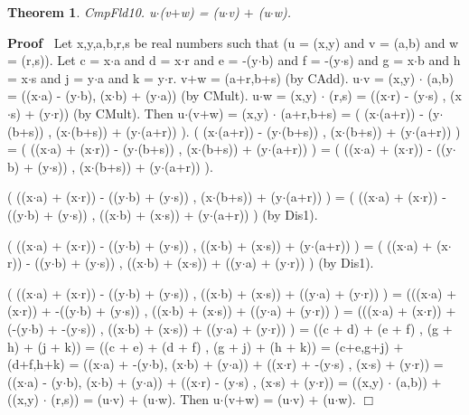\documentclass{article}
\newenvironment{forthel}{\begin{leftbar}}{\end{leftbar}}
\newenvironment{proof}{\noindent\textbf{Proof\ }}{\hspace*{\fill}$\Box$\medskip}
\newtheorem{theorem}{Theorem}
\newcommand{\cmul}{\cdot}
\newcommand{\cadd}{+}
\begin{document}
\begin{forthel}
\begin{theorem}
 CmpFld10. u$\cmul$(v$\cadd$w) = (u$\cmul$v) $\cadd$ (u$\cmul$w).
\end{theorem}\begin{proof}
	Let x,y,a,b,r,s be real numbers such that (u = (x,y) and v = (a,b) and w = (r,s)).
Let c = x$\cdot$a and d = x$\cdot$r and e = -(y$\cdot$b) and f = -(y$\cdot$s) and g = x$\cdot$b and  h = x$\cdot$s and  j = y$\cdot$a and k = y$\cdot$r.
v$\cadd$w = (a+r,b+s) (by CAdd).
u$\cmul$v = (x,y) $\cmul$ (a,b) = ((x$\cdot$a) - (y$\cdot$b), (x$\cdot$b) + (y$\cdot$a)) (by CMult).  
u$\cmul$w = (x,y) $\cmul$ (r,s) = ((x$\cdot$r) - (y$\cdot$s) , (x$\cdot$s) + (y$\cdot$r)) (by CMult). 
Then u$\cmul$(v$\cadd$w) 	= (x,y) $\cmul$ (a+r,b+s) = ( (x$\cdot$(a+r)) - (y$\cdot$(b+s)) , (x$\cdot$(b+s)) + (y$\cdot$(a+r)) ).
( (x$\cdot$(a+r)) - (y$\cdot$(b+s)) , (x$\cdot$(b+s)) + (y$\cdot$(a+r)) )
= ( ((x$\cdot$a) + (x$\cdot$r)) - (y$\cdot$(b+s)) , (x$\cdot$(b+s)) + (y$\cdot$(a+r)) )
= ( ((x$\cdot$a) + (x$\cdot$r)) - ((y$\cdot$b) + (y$\cdot$s)) , (x$\cdot$(b+s)) + (y$\cdot$(a+r)) ).

( ((x$\cdot$a) + (x$\cdot$r)) - ((y$\cdot$b) + (y$\cdot$s)) , (x$\cdot$(b+s)) + (y$\cdot$(a+r)) )
= ( ((x$\cdot$a) + (x$\cdot$r)) - ((y$\cdot$b) + (y$\cdot$s)) , ((x$\cdot$b) + (x$\cdot$s)) + (y$\cdot$(a+r)) ) (by Dis1).

( ((x$\cdot$a) + (x$\cdot$r)) - ((y$\cdot$b) + (y$\cdot$s)) , ((x$\cdot$b) + (x$\cdot$s)) + (y$\cdot$(a+r)) )
= ( ((x$\cdot$a) + (x$\cdot$r)) - ((y$\cdot$b) + (y$\cdot$s)) , ((x$\cdot$b) + (x$\cdot$s)) + ((y$\cdot$a) + (y$\cdot$r)) ) (by Dis1).

( ((x$\cdot$a) + (x$\cdot$r)) - ((y$\cdot$b) + (y$\cdot$s)) , ((x$\cdot$b) + (x$\cdot$s)) + ((y$\cdot$a) + (y$\cdot$r)) )
= (((x$\cdot$a) + (x$\cdot$r)) + -((y$\cdot$b) + (y$\cdot$s)) , ((x$\cdot$b) + (x$\cdot$s)) + ((y$\cdot$a) + (y$\cdot$r)) )
= (((x$\cdot$a) + (x$\cdot$r)) + (-(y$\cdot$b) + -(y$\cdot$s)) , ((x$\cdot$b) + (x$\cdot$s)) + ((y$\cdot$a) + (y$\cdot$r)) )
= ((c + d) + (e + f) , (g + h) + (j + k))
= ((c + e) + (d + f) , (g + j) + (h + k))
= (c+e,g+j) $\cadd$ (d+f,h+k)
= ((x$\cdot$a) + -(y$\cdot$b), (x$\cdot$b) + (y$\cdot$a)) $\cadd$ ((x$\cdot$r) + -(y$\cdot$s) , (x$\cdot$s) + (y$\cdot$r))
= ((x$\cdot$a) - (y$\cdot$b), (x$\cdot$b) + (y$\cdot$a)) $\cadd$ ((x$\cdot$r) - (y$\cdot$s) , (x$\cdot$s) + (y$\cdot$r))
= ((x,y) $\cmul$ (a,b)) $\cadd$ ((x,y) $\cmul$ (r,s)) 
= (u$\cmul$v) $\cadd$ (u$\cmul$w).
Then u$\cmul$(v$\cadd$w) = (u$\cmul$v) $\cadd$ (u$\cmul$w).
\end{proof}



\end{forthel}
\end{document}
